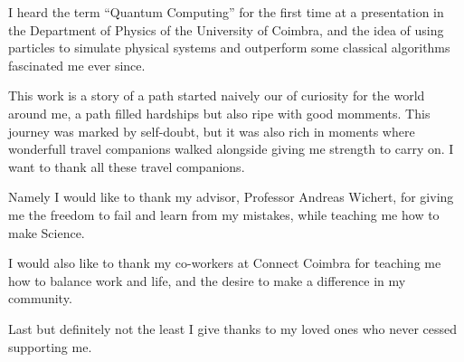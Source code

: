 
\begin{acknowledgments} 

 I heard the term ``Quantum Computing'' for the first time at a presentation in the Department of Physics of the University of Coimbra, and the idea of using particles to simulate physical systems and outperform some classical algorithms fascinated me ever since. 

This work is a story of a path started naively our of curiosity for the world around me, a path filled hardships but also ripe with good momments.
This journey was marked by self-doubt, but it was also rich in moments where wonderfull travel companions walked alongside giving me strength to carry on. I want to thank all these travel companions.

Namely I would like to thank my advisor, Professor Andreas Wichert, for giving me the freedom to fail and learn from my mistakes, while teaching me how to make Science. 

I would also like to thank my co-workers at Connect Coimbra for teaching me how to balance work and life, and the desire to make a difference in my community.

Last but definitely not the least I give thanks to my loved ones who never cessed supporting me. 
 
\end{acknowledgments}
\clearpage
\thispagestyle{empty}
\cleardoublepage